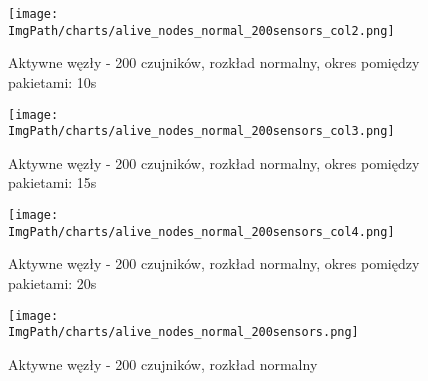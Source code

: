 \begin{figure}[!htbp]
	\begin{center}
		\texttt{[image: \\ImgPath/charts/alive\_nodes\_normal\_200sensors\_col2.png]}
	\end{center}
	\caption{Aktywne węzły - 200 czujników, rozkład normalny, okres pomiędzy pakietami: 10s}
\end{figure}

\begin{figure}[!htbp]
	\begin{center}
		\texttt{[image: \\ImgPath/charts/alive\_nodes\_normal\_200sensors\_col3.png]}
	\end{center}
	\caption{Aktywne węzły - 200 czujników, rozkład normalny, okres pomiędzy pakietami: 15s}
\end{figure}

\begin{figure}[!htbp]
	\begin{center}
		\texttt{[image: \\ImgPath/charts/alive\_nodes\_normal\_200sensors\_col4.png]}
	\end{center}
	\caption{Aktywne węzły - 200 czujników, rozkład normalny, okres pomiędzy pakietami: 20s}
\end{figure}

\begin{figure}[!htbp]
	\begin{center}
		\texttt{[image: \\ImgPath/charts/alive\_nodes\_normal\_200sensors.png]}
	\end{center}
	\caption{Aktywne węzły - 200 czujników, rozkład normalny}
\end{figure}